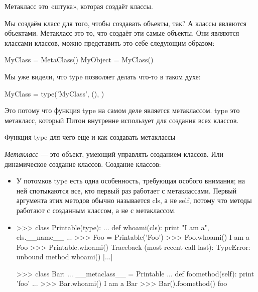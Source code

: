Метакласс это «штука», которая создаёт классы.

Мы создаём класс для того, чтобы создавать объекты, так? А классы являются объектами. Метакласс это то, что создаёт эти самые объекты. Они являются классами классов, можно представить это себе следующим образом:
\begin{python}
  MyClass = MetaClass()
  MyObject = MyClass()
\end{python}

Мы уже видели, что type позволяет делать что-то в таком духе:
\begin{python}
  MyClass = type('MyClass', (), {})
\end{python}

Это потому что функция type на самом деле является метаклассом. type это метакласс, который Питон внутренне использует для создания всех классов.
	
		Функция type для чего еще и как создавать метаклассы
		
		\textit{Метакласс} — это объект, умеющий управлять созданием классов. Или динамическое создание классов.
		Создание классов:
		
		\begin{itemize}
		\item {}
		У потомков type есть одна особенность, требующая особого внимания; на ней спотыкаются все, кто первый раз работает с метаклассами. Первый аргумента этих методов обычно называется cls, а не self, потому что методы работают с созданным классом, а не с метаклассом. 
		\item 
		\begin{python}
			>>> class Printable(type):
			...     def whoami(cls): print "I am a", cls.__name__
			...
			>>> Foo = Printable('Foo')
			>>> Foo.whoami()
			I am a Foo
			>>> Printable.whoami()
			Traceback (most recent call last):
			TypeError:  unbound method whoami() [...]
			
			>>> class Bar:
			...     __metaclass__ = Printable
			...     def foomethod(self): print 'foo'
			...
			>>> Bar.whoami()
			I am a Bar
			>>> Bar().foomethod()
			foo	
		\end{python}
	\end{itemize}
